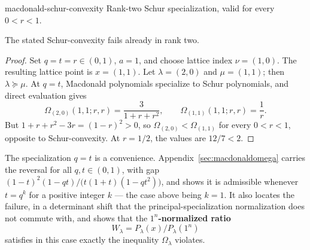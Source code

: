 \begin{cxcertificate}{macdonald-schur-convexity}
Rank-two Schur specialization, valid for every $0<r<1$.
\end{cxcertificate}

\begin{cxrefutation}
\begin{theorem}\label{thm:macdonald}
The stated Schur-convexity fails already in rank two.
\end{theorem}
\begin{proof}
Set $q=t=r\in(0,1)$, $a=1$, and choose lattice index $\nu=(1,0)$.  The resulting lattice point is $x=(1,1)$.  Let $\lambda=(2,0)$ and $\mu=(1,1)$; then $\lambda\succeq\mu$.  At $q=t$, Macdonald polynomials specialize to Schur polynomials, and direct evaluation gives
\[
\Omega_{(2,0)}(1,1;r,r)=\frac{3}{1+r+r^2},\qquad
\Omega_{(1,1)}(1,1;r,r)=\frac1r.
\]
But $1+r+r^2-3r=(1-r)^2>0$, so $\Omega_{(2,0)}<\Omega_{(1,1)}$ for every $0<r<1$, opposite to Schur-convexity.  At $r=1/2$, the values are $12/7<2$.
\end{proof}

\begin{remark}[Scope]
The specialization $q=t$ is a convenience.  Appendix~\ref{sec:macdonaldomega} carries the reversal for all $q,t\in(0,1)$, with gap $(1-t)^2(1-qt)/\bigl(t(1+t)(1-qt^2)\bigr)$, and shows it is admissible whenever $t=q^k$ for a positive integer $k$ --- the case above being $k=1$.  It also locates the failure, in a determinant shift that the principal-specialization normalization does not commute with, and shows that the \textbf{$1^n$-normalized ratio}
\begin{equation*}
  W_\lambda=P_\lambda(x)/P_\lambda(1^n)
\end{equation*}
satisfies in this case exactly the inequality $\Omega_\lambda$ violates.  %
\end{remark}
\end{cxrefutation}


